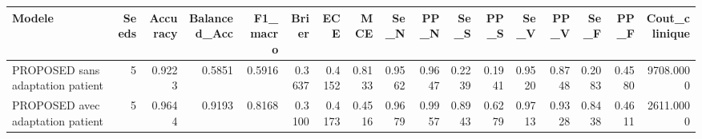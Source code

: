 \begin{tabular}{lrrrrrrrrrrrrrrrr}
\toprule
Modele & Seeds & Accuracy & Balanced_Acc & F1_macro & Brier & ECE & MCE & Se_N & PP_N & Se_S & PP_S & Se_V & PP_V & Se_F & PP_F & Cout_clinique \\
\midrule
PROPOSED sans adaptation patient & 5 & 0.9223 & 0.5851 & 0.5916 & 0.3637 & 0.4152 & 0.8133 & 0.9562 & 0.9647 & 0.2239 & 0.1941 & 0.9520 & 0.8748 & 0.2083 & 0.4580 & 9708.0000 \\
PROPOSED avec adaptation patient & 5 & 0.9644 & 0.9193 & 0.8168 & 0.3100 & 0.4173 & 0.4516 & 0.9679 & 0.9957 & 0.8943 & 0.6279 & 0.9713 & 0.9328 & 0.8438 & 0.4611 & 2611.0000 \\
\bottomrule
\end{tabular}
